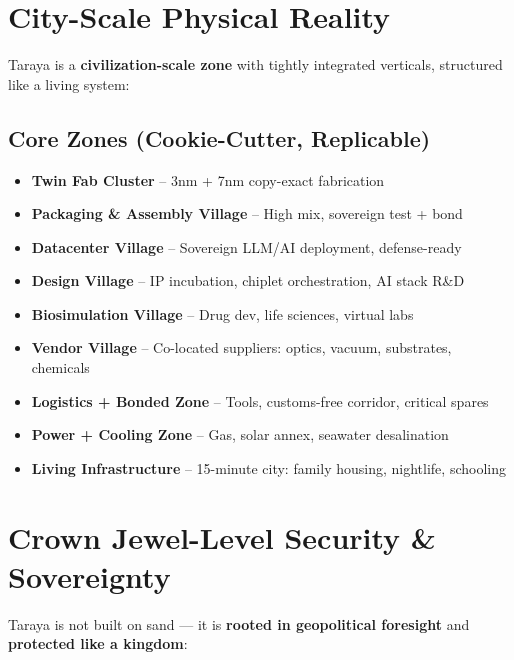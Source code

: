 \documentclass{article}
\begin{document}
  \vspace{1em}

  \section*{City-Scale Physical Reality}

  Taraya is a \textbf{civilization-scale zone} with tightly integrated verticals, structured like a living system:

  \subsection*{Core Zones (Cookie-Cutter, Replicable)}
  \begin{itemize}
    \item \textbf{Twin Fab Cluster} – 3nm + 7nm copy-exact fabrication
    \item \textbf{Packaging \& Assembly Village} – High mix, sovereign test + bond
    \item \textbf{Datacenter Village} – Sovereign LLM/AI deployment, defense-ready
    \item \textbf{Design Village} – IP incubation, chiplet orchestration, AI stack R\&D
    \item \textbf{Biosimulation Village} – Drug dev, life sciences, virtual labs
    \item \textbf{Vendor Village} – Co-located suppliers: optics, vacuum, substrates, chemicals
    \item \textbf{Logistics + Bonded Zone} – Tools, customs-free corridor, critical spares
    \item \textbf{Power + Cooling Zone} – Gas, solar annex, seawater desalination
    \item \textbf{Living Infrastructure} – 15-minute city: family housing, nightlife, schooling
  \end{itemize}

  \vspace{1em}

  \section*{Crown Jewel-Level Security \& Sovereignty}

  Taraya is not built on sand — it is \textbf{rooted in geopolitical foresight} and \textbf{protected like a kingdom}:
\end{document}
